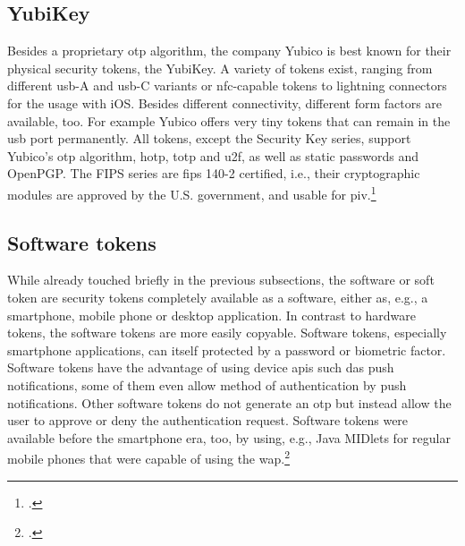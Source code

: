 \subsection{YubiKey}

Besides a proprietary \gls{otp} algorithm, the company Yubico is best known for their physical security tokens, the YubiKey. A variety of tokens exist, ranging from different \gls{usb}-A and \gls{usb}-C variants or \gls{nfc}-capable tokens to lightning connectors for the usage with iOS. Besides different connectivity, different form factors are available, too. For example Yubico offers very tiny tokens that can remain in the \gls{usb} port permanently. All tokens, except the \frqq Security Key\flqq{} series, support Yubico's \gls{otp} algorithm, \gls{hotp}, \gls{totp} and \gls{u2f}, as well as static passwords and OpenPGP. The \frqq FIPS series\flqq{} are \gls{fips} 140-2 certified, i.e., their cryptographic modules are approved by the U.S. government, and usable for \gls{piv}.\footcites[See][716]{HUSEYNOV2017715}[See][83]{Jacobs:2016:STA:2953926.2953927}[See][109]{Jacobs:2019}

\subsection{Software tokens}

While already touched briefly in the previous subsections, the software or soft token are security tokens completely available as a software, either as, e.g., a smartphone, mobile phone or desktop application. In contrast to hardware tokens, the software tokens are more easily copyable. Software tokens, especially smartphone applications, can itself protected by a password or biometric factor. Software tokens have the advantage of using device \glspl{api} such das push notifications, some of them even allow method of \frqq authentication by push notifications\flqq. Other software tokens do not generate an \gls{otp} but instead allow the user to approve or deny the authentication request. Software tokens were available before the smartphone era, too, by using, e.g., Java MIDlets for regular mobile phones that were capable of using the \gls{wap}.\footcites[See][717]{HUSEYNOV2017715}[See][111]{ELMALIKI201475}[See][60]{Ulqinaku:2019:FPP:3317549.3323404}[See][222--223]{dasgupta2017multi}[See][3]{4300040}
